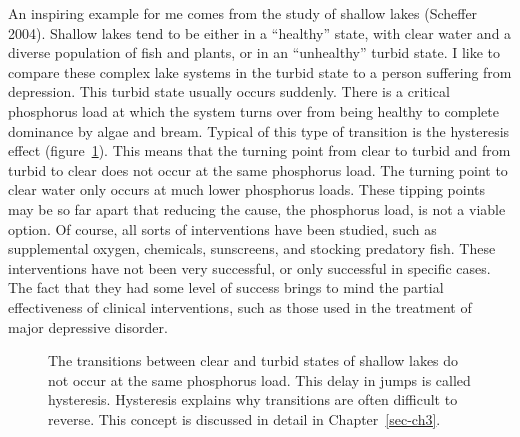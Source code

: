 \documentclass[
  a4paper,
  DIV=11,
  numbers=noendperiod,
  oneside]{scrreprt}
\begin{document}
An inspiring example for me comes from the study of shallow lakes
(Scheffer 2004). Shallow lakes tend to be either in a ``healthy'' state,
with clear water and a diverse population of fish and plants, or in an
``unhealthy'' turbid state. I like to compare these complex lake systems
in the turbid state to a person suffering from depression. This turbid
state usually occurs suddenly. There is a critical phosphorus load at
which the system turns over from being healthy to complete dominance by
algae and bream. Typical of this type of transition is the hysteresis
effect (figure~\ref{fig-ch1-img2}). This means that the turning point
from clear to turbid and from turbid to clear does not occur at the same
phosphorus load. The turning point to clear water only occurs at much
lower phosphorus loads. These tipping points may be so far apart that
reducing the cause, the phosphorus load, is not a viable option. Of
course, all sorts of interventions have been studied, such as
supplemental oxygen, chemicals, sunscreens, and stocking predatory fish.
These interventions have not been very successful, or only successful in
specific cases. The fact that they had some level of success brings to
mind the partial effectiveness of clinical interventions, such as those
used in the treatment of major depressive disorder.

\begin{figure}


\caption{\label{fig-ch1-img2}The transitions between clear and turbid
states of shallow lakes do not occur at the same phosphorus load. This
delay in jumps is called hysteresis. Hysteresis explains why transitions
are often difficult to reverse. This concept is discussed in detail in
Chapter~\ref{sec-ch3}.}

\end{figure}%
\end{document}
